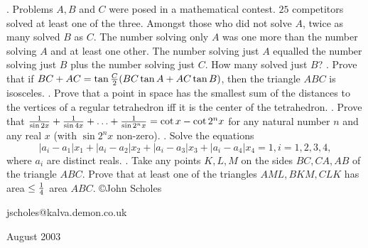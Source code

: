 \nopagenumbers
{}
\vskip 25pt
. Problems $A,B$ and $C$ were posed in a mathematical contest. $25$ competitors solved at least one of the three. Amongst those who did not solve $A$, twice as many solved $B$ as $C$. The number solving only $A$ was one more than the number solving $A$ and at least one other. The number solving just $A$ equalled the number solving just $B$ plus the number solving just $C$. How many solved just $B$?
\vskip 12pt
. Prove that if $BC+AC=\tan{C\over2}(BC\tan A+AC\tan B)$, then the triangle $ABC$ is isosceles.
\vskip 12pt
. Prove that a point in space has the smallest sum of the distances to the vertices of a regular tetrahedron iff it is the center of the tetrahedron.
\vskip 12pt
. Prove that ${1\over\sin{2x}}+{1\over\sin{4x}}+\ldots+{1\over\sin{2^nx}}=\cot x-\cot{2^nx}$ for any natural number $n$ and any real $x$ (with $\sin{2^nx}$ non-zero).
\vskip 12pt
. Solve the equations $$|a_i-a_1|x_1+|a_i-a_2|x_2+|a_i-a_3|x_3+|a_i-a_4|x_4=1,i=1,2,3,4,$$ where $a_i$ are distinct reals.
\vskip 12pt
. Take any points $K,L,M$ on the sides $BC,CA,AB$ of the triangle $ABC$. Prove that at least one of the triangles $AML,BKM,CLK$ has area $\le{1\over4}$ area $ABC$.
\vskip 20pt
\noindent \copyright John Scholes

\noindent jscholes@kalva.demon.co.uk

 August 2003

\bye
